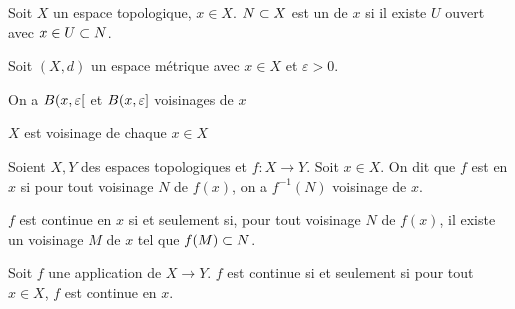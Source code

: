 \documentclass[french,a4paper,10pt]{article}
\begin{document}
		\begin{definition}
			Soit $X$ un espace topologique, $x\in X$. $N\subset X$ est un  de $x$ si il existe $U$ ouvert avec $x\in U\subset N$.
		\end{definition}
		\begin{example}
			Soit $(X, d)$ un espace métrique avec $x\in X$ et $\varepsilon>0$. 
			
			On a $B({x, \varepsilon}\mathopen{}[\mathclose{}$ et $B({x, \varepsilon}\mathopen{}]\mathclose{}$ voisinages de $x$
		\end{example}
		\begin{example}
			$X$ est voisinage de chaque $x\in X$
		\end{example}
		\begin{definition}
			Soient $X, Y$ des espaces topologiques et $f\colon X\to Y$. Soit $x\in X$. On dit que $f$ est  en $x$ si pour tout voisinage $N$ de $f(x)$, on a $f^{-1}(N)$ voisinage de $x$.
		\end{definition}
		\begin{remark}
			$f$ est continue en $x$ si et seulement si, pour tout voisinage $N$ de $f(x)$, il existe un voisinage $M$ de $x$ tel que $f(M)\subset N$.
		\end{remark}
		\begin{proposition}
			Soit $f$ une application de $X\to Y$. $f$ est continue si et seulement si pour tout $x\in X$, $f$ est continue en $x$.
		\end{proposition}
\end{document}

